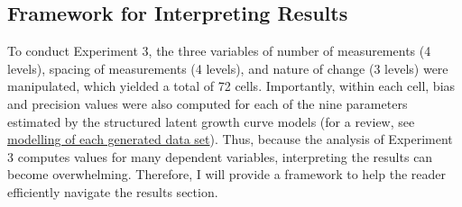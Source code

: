 \documentclass[
12pt, %
twoside,
english]{guelphthesis}
\begin{document}
\hypertarget{framework-for-interpreting-results-2}{%
\subsection{Framework for Interpreting Results}\label{framework-for-interpreting-results-2}}

To conduct Experiment 3, the three variables of number of measurements (4 levels), spacing of measurements (4 levels), and nature of change (3 levels) were manipulated, which yielded a total of 72 cells. Importantly, within each cell, bias and precision values were also computed for each of the nine parameters estimated by the structured latent growth curve models (for a review, see \protect\hyperlink{modelling-data-sets}{modelling of each generated data set}). Thus, because the analysis of Experiment 3 computes values for many dependent variables, interpreting the results can become overwhelming. Therefore, I will provide a framework to help the reader efficiently navigate the results section.
\end{document}
